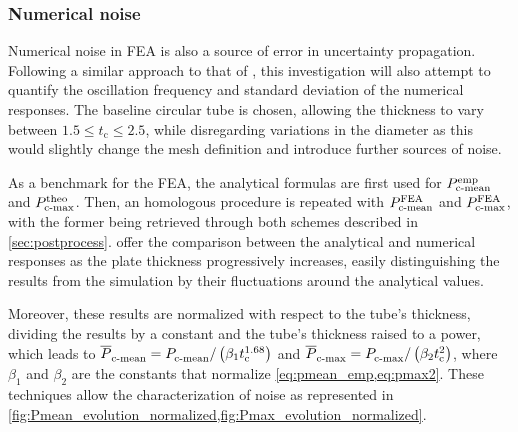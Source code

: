 \documentclass[12pt,number,preprint,review,times]{elsarticle}
\begin{document}
\subsubsection{Numerical noise}

Numerical noise in FEA is also a source of error in uncertainty propagation. Following a similar approach to that of \citet{gilkeson_dealing_2014}, this investigation will also attempt to quantify the oscillation frequency and standard deviation of the numerical responses. The baseline circular tube is chosen, allowing the thickness to vary between $1.5 \leq t_\mathrm{c} \leq 2.5$, while disregarding variations in the diameter as this would slightly change the mesh definition and introduce further sources of noise.

As a benchmark for the FEA, the analytical formulas are first used for ${P}^{\mathrm{emp}}_{\mathrm{c{\text -}mean}}$ and ${P}^{\mathrm{theo}}_{\mathrm{c{\text -}max}}$. Then, an homologous procedure is repeated with ${P}^{\mathrm{FEA}}_{\mathrm{c{\text -}mean}}$ and ${P}^{\mathrm{FEA}}_{\mathrm{c{\text -}max}}$, with the former being retrieved through both schemes described in \cref{sec:postprocess}.  offer the comparison between the analytical and numerical responses as the plate thickness progressively increases, easily distinguishing the results from the simulation by their fluctuations around the analytical values.

Moreover, these results are normalized with respect to the tube's thickness, dividing the results by a constant and the tube's thickness raised to a power, which leads to $\overline{P}^{\mathrm{}}_{\mathrm{c{\text -}mean}} = {P}^{\mathrm{}}_{\mathrm{c{\text -}mean}} / \left(\beta_1 t_{\mathrm{c}}^{1.68}\right)$ and $\overline{P}^{\mathrm{}}_{\mathrm{c{\text -}max}} = {P}^{\mathrm{}}_{\mathrm{c{\text -}max}} / \left(\beta_2 t_{\mathrm{c}}^{2}\right)$, where $\beta_1$ and $\beta_2$ are the constants that normalize \cref{eq:pmean_emp,eq:pmax2}. These techniques allow the characterization of noise as represented in \cref{fig:Pmean_evolution_normalized,fig:Pmax_evolution_normalized}. 



\end{document}
